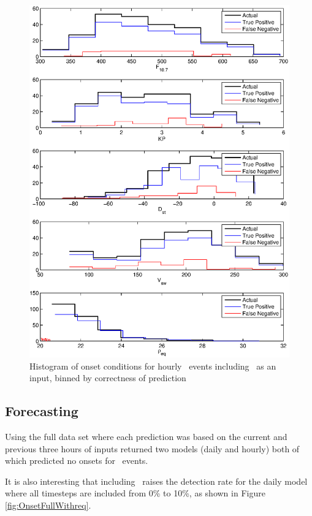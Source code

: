 \begin{figure}[htp!]
	\centering
	\includegraphics[width=1\linewidth]{Figures/CH5/NNBinaryOnset-hourly-withreq-hist.eps}
	\caption{Histogram of onset conditions for hourly \req\ events including \req\ as an input, binned by correctness of prediction}
	\label{fig:OnsetWithreq-hist}
\end{figure}

\subsection{Forecasting}

Using the full data set where each prediction was based on the current and previous three hours of inputs returned two models (daily and hourly) both of which predicted no onsets for \req\ events.



It is also interesting that including \req\ raises the detection rate for the daily model where all timesteps are included from 0\% to 10\%, as shown in Figure \ref{fig:OnsetFullWithreq}.

